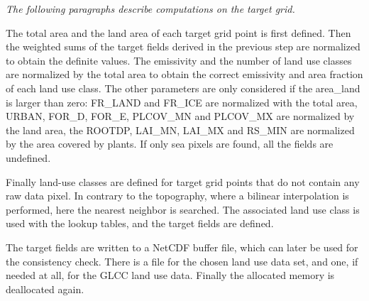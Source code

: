 \documentclass[a4paper,10pt,DIV14,BCOR1cm,titlepage,twoside]{scrartcl}
\begin{document}
\textit{The following paragraphs describe computations on the target grid.}  \par\medskip\noindent
The total area and the land area of each target grid point is first defined. Then the weighted sums of the target fields derived in the previous step are normalized to obtain the definite values. The emissivity and the number of land use classes are normalized by the total area to obtain the correct emissivity and area fraction of each land use class. The other parameters are only considered if the area\_land is larger than zero: FR\_LAND and FR\_ICE are normalized with the total area, URBAN, FOR\_D, FOR\_E, PLCOV\_MN and PLCOV\_MX are normalized by the land area, the ROOTDP, LAI\_MN, LAI\_MX and RS\_MIN are normalized by the area covered by plants. If only sea pixels are found, all the fields are undefined.  \par\medskip\noindent
Finally land-use classes are defined for target grid points that do not contain any raw data pixel. In contrary to the topography, where a bilinear interpolation is performed, here the nearest neighbor is searched. The associated land use class is used with the lookup tables, and the target fields are defined.  \par\medskip\noindent
The target fields are written to a NetCDF buffer file, which can later be used for the consistency check. There is a file for the chosen land use data set, and one, if needed at all, for the GLCC land use data. Finally the allocated memory is deallocated again.  \par\medskip\noindent
\end{document}
